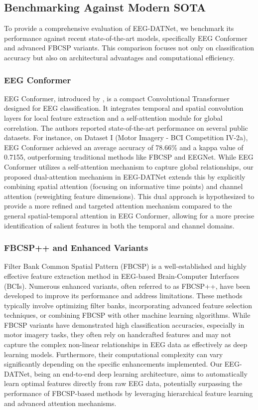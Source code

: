 \documentclass[pdflatex,sn-mathphys-num]{sn-jnl}
\theoremstyle{thmstyleone}%
\theoremstyle{thmstyletwo}%
\theoremstyle{thmstylethree}%
\begin{document}
\subsection{Benchmarking Against Modern SOTA}

To provide a comprehensive evaluation of EEG-DATNet, we benchmark its performance against recent state-of-the-art models, specifically EEG Conformer \cite{song2023eeg} and advanced FBCSP variants. This comparison focuses not only on classification accuracy but also on architectural advantages and computational efficiency.

\subsubsection{EEG Conformer}

EEG Conformer, introduced by \citet{song2023eeg}, is a compact Convolutional Transformer designed for EEG classification. It integrates temporal and spatial convolution layers for local feature extraction and a self-attention module for global correlation. The authors reported state-of-the-art performance on several public datasets. For instance, on Dataset I (Motor Imagery - BCI Competition IV-2a), EEG Conformer achieved an average accuracy of 78.66\% and a kappa value of 0.7155, outperforming traditional methods like FBCSP and EEGNet. While EEG Conformer utilizes a self-attention mechanism to capture global relationships, our proposed dual-attention mechanism in EEG-DATNet extends this by explicitly combining spatial attention (focusing on informative time points) and channel attention (reweighting feature dimensions). This dual approach is hypothesized to provide a more refined and targeted attention mechanism compared to the general spatial-temporal attention in EEG Conformer, allowing for a more precise identification of salient features in both the temporal and channel domains.

\subsubsection{FBCSP++ and Enhanced Variants}

Filter Bank Common Spatial Pattern (FBCSP) is a well-established and highly effective feature extraction method in EEG-based Brain-Computer Interfaces (BCIs). Numerous enhanced variants, often referred to as FBCSP++, have been developed to improve its performance and address limitations. These methods typically involve optimizing filter banks, incorporating advanced feature selection techniques, or combining FBCSP with other machine learning algorithms. While FBCSP variants have demonstrated high classification accuracies, especially in motor imagery tasks, they often rely on handcrafted features and may not capture the complex non-linear relationships in EEG data as effectively as deep learning models. Furthermore, their computational complexity can vary significantly depending on the specific enhancements implemented. Our EEG-DATNet, being an end-to-end deep learning architecture, aims to automatically learn optimal features directly from raw EEG data, potentially surpassing the performance of FBCSP-based methods by leveraging hierarchical feature learning and advanced attention mechanisms.
\end{document}
